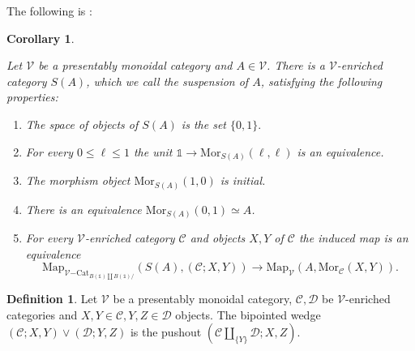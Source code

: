 \documentclass[10pt,oneside]{article}
\numberwithin{equation}{section} %
\numberwithin{figure}{section} %
\theoremstyle{plain}
\newtheorem{corollary}[theorem]{Corollary}
\theoremstyle{definition}
\newtheorem{definition}[theorem]{Definition}
\newcommand{\mC}{{\mathcal C}}
\newcommand{\mD}{{\mathcal D}}
\newcommand{\mV}{{\mathcal V}}
\newcommand{\A}{A}
\newcommand{\X}{X}
\newcommand{\Y}{Y}
\newcommand{\Cat}{\mathrm{Cat}}
\newcommand{\tu}{{\mathbb 1}}
\newcommand{\Map}{{\mathrm{Map}}}
\newcommand{\Mor}{{\mathrm{Mor}}}
\begin{document}
The following is \cite[Corollary 2.2.2.]{GepnerHeine2026}:

\begin{corollary}\label{susp}

Let $\mV$ be a presentably monoidal category and $\A \in \mV$.
There is a $\mV$-enriched category $S(\A) $, which we call the suspension of $A$, satisfying the following properties:
\begin{enumerate}[\normalfont(1)]\setlength{\itemsep}{-2pt}
\item The space of objects of $S(\A) $ is the set $\{0,1\}.$

\item For every $0 \leq \ell \leq 1$ the unit $\tu \to \Mor_{S(\A)}(\ell,\ell)$ is an equivalence.

\item The morphism object $\Mor_{S(\A)}(1,0)$ is initial.

\item There is an equivalence $ \Mor_{S(\A)}(0,1) \simeq \A$. 

\item For every $\mV$-enriched category $\mC $ and objects $\X,\Y$ of $\mC$
the induced map is an equivalence $$ \Map_{\mV\mathrm{-}\Cat_{B(\tu) \coprod B(\tu)/}}(S(\A), (\mC; \X,\Y)) \to \Map_\mV(\A, \Mor_\mC(\X,\Y)).$$
\end{enumerate}
    
\end{corollary}

\begin{definition}
Let $\mV$ be a presentably monoidal category, $\mC, \mD$ be $\mV$-enriched categories and $X,Y \in \mC, Y,Z \in \mD$
objects. The bipointed wedge $(\mC; X,Y) \vee (\mD; Y,Z) $
is the pushout $ (\mC \coprod_{\{Y\}} \mD; X,Z).$
    
\end{definition}
\end{document}
